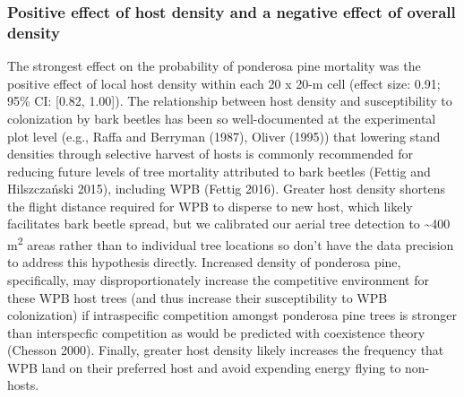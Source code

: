 \documentclass[]{article}
\begin{document}
\hypertarget{positive-effect-of-host-density-and-a-negative-effect-of-overall-density}{%
\subsubsection{Positive effect of host density and a negative effect of
overall
density}\label{positive-effect-of-host-density-and-a-negative-effect-of-overall-density}}

The strongest effect on the probability of ponderosa pine mortality was
the positive effect of local host density within each 20 x 20-m cell
(effect size: 0.91; 95\% CI: {[}0.82, 1.00{]}). The relationship between
host density and susceptibility to colonization by bark beetles has been
so well-documented at the experimental plot level (e.g., Raffa and
Berryman (1987), Oliver (1995)) that lowering stand densities through
selective harvest of hosts is commonly recommended for reducing future
levels of tree mortality attributed to bark beetles (Fettig and
Hilszczański 2015), including WPB (Fettig 2016). Greater host density
shortens the flight distance required for WPB to disperse to new host,
which likely facilitates bark beetle spread, but we calibrated our
aerial tree detection to \textasciitilde{}400 m\textsuperscript{2} areas
rather than to individual tree locations so don't have the data
precision to address this hypothesis directly. Increased density of
ponderosa pine, specifically, may disproportionately increase the
competitive environment for these WPB host trees (and thus increase
their susceptibility to WPB colonization) if intraspecific competition
amongst ponderosa pine trees is stronger than interspecfic competition
as would be predicted with coexistence theory (Chesson 2000). Finally,
greater host density likely increases the frequency that WPB land on
their preferred host and avoid expending energy flying to non-hosts.
\end{document}

